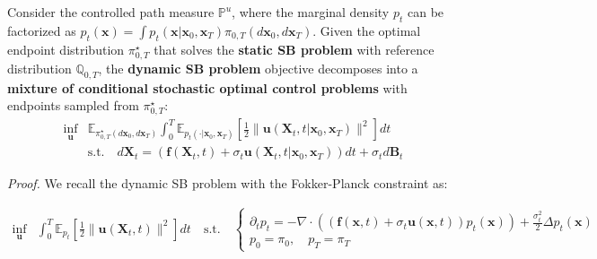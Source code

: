 \documentclass{article}
\begin{document}
\begin{proposition}\label{prop:condsoc-mixture}
    Consider the controlled path measure $\mathbb{P}^u$, where the marginal density $p_t$ can be factorized as $p_t(\boldsymbol{x})=\int p_t(\boldsymbol{x}|\boldsymbol{x}_0, \boldsymbol{x}_T)\pi_{0,T}(d\boldsymbol{x}_0, d\boldsymbol{x}_T)$. Given the optimal endpoint distribution $\pi^\star_{0,T}$ that solves the \textbf{static SB problem} with reference distribution $\mathbb{Q}_{0,T}$, the \textbf{dynamic SB problem} objective decomposes into a \textbf{mixture of conditional stochastic optimal control problems} with endpoints sampled from $\pi^\star_{0,T}$:
    \begin{align}
        \inf_{\boldsymbol{u}}&\mathbb{E}_{\pi^\star_{0,T}(d\boldsymbol{x}_0,d\boldsymbol{x}_T)}\int_0^T\mathbb{E}_{p_t(\cdot|\boldsymbol{x}_0, \boldsymbol{x}_T)}\left[\frac{1}{2}\|\boldsymbol{u}(\boldsymbol{X}_t,t|\boldsymbol{x}_0, \boldsymbol{x}_T)\|^2 \right]dt\tag{Conditional SOC Objective}\label{eq:condsoc-objective}\\
        &\text{s.t.}\quad d\boldsymbol{X}_t=(\boldsymbol{f}(\boldsymbol{X}_t,t)+\sigma_t\boldsymbol{u}(\boldsymbol{X}_t,t|\boldsymbol{x}_0, \boldsymbol{x}_T))dt+\sigma_td\boldsymbol{B}_t\nonumber
    \end{align}
\end{proposition}

\textit{Proof.} We recall the dynamic SB problem with the Fokker-Planck constraint as:
\begin{small}
\begin{align}
    \inf_{\boldsymbol{u}}&\int_0^T\mathbb{E}_{p_t}\left[\frac{1}{2}\|\boldsymbol{u}(\boldsymbol{X}_t,t)\|^2 \right]dt\quad \text{s.t.}\quad \begin{cases}
        \partial_tp_t=-\nabla\cdot \left((\boldsymbol{f}(\boldsymbol{x},t)+\sigma_t\boldsymbol{u}(\boldsymbol{x},t))p_t(\boldsymbol{x})\right)+\frac{\sigma^2_t}{2}\Delta p_t(\boldsymbol{x})\\
        p_0=\pi_0, \quad p_T=\pi_T
    \end{cases}
\end{align}
\end{small}
\end{document}
